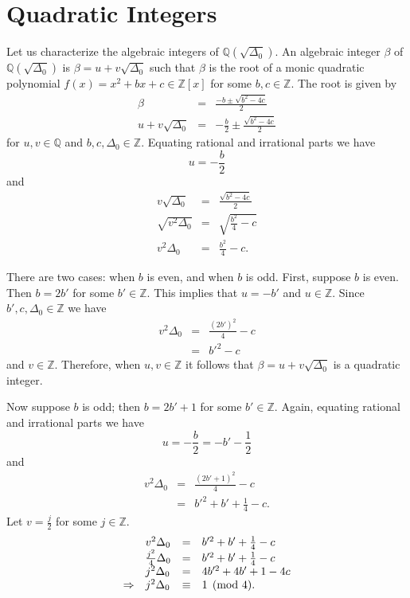 \documentclass{ucalgthes1}
\theoremstyle{plain}
\theoremstyle{definition}
\newcommand{\ZZ}{\mathbb{Z}}
\newcommand{\QQ}{\mathbb{Q}}
\begin{document}
\bigbreak
\section{Quadratic Integers}
Let us characterize the algebraic integers of $\QQ(\sqrt{\Delta_0})$.  An algebraic integer $\beta$ of $\QQ(\sqrt{\Delta_0})$ is $\beta = u+v \sqrt{\Delta_0}$ such that $\beta$ is the root of a monic quadratic polynomial $f(x) = x^2+bx+c \in \ZZ[x]$ for some $b,c \in \ZZ$.  The root is given by
\begin{eqnarray*}
	\beta & = & \frac{-b \pm \sqrt{b^2-4c}}{2} \\
	u + v \sqrt{\Delta_0} & = & -\frac{b}{2} \pm \frac{\sqrt{b^2-4c}}{2}
\end{eqnarray*}
for $u,v \in \QQ$ and $b,c,\Delta_0 \in \ZZ$.
Equating rational and irrational parts we have
\[
	u = -\frac{b}{2}
\]
and
\begin{eqnarray*}
	v \sqrt{\Delta_0} & = & \frac{\sqrt{b^2 -4c}}{2} \\
	\sqrt{v^2 \Delta_0} & = & \sqrt{\frac{b^2}{4} - c} \\
	v^2 \Delta_0 & = & \frac{b^2}{4} - c.
\end{eqnarray*}


There are two cases: when $b$ is even, and when $b$ is odd.  First, suppose $b$ is even.  Then $b=2b'$ for some $b' \in \ZZ$.  This implies that $u = -b'$ and $u \in \ZZ$.  Since $b', c, \Delta_0 \in \ZZ$ we have
\begin{eqnarray*}
	v^2 \Delta_0 & = & \frac{(2b')^2}{4} - c \\
	& = & b'^2 - c
\end{eqnarray*}
and $v \in \ZZ$.  Therefore, when $u, v \in \ZZ$ it follows that $\beta = u + v \sqrt{\Delta_0}$ is a quadratic integer.

\bigbreak
Now suppose $b$ is odd; then $b=2b' + 1$ for some $b' \in \ZZ$.  Again, equating rational and irrational parts we have
\[
	u = - \frac{b}{2} = -b' - \frac{1}{2}
\]
and
\begin{eqnarray*}
	v^2 \Delta_0 & = & \frac{(2b'+1)^2}{4} - c \\
	& = & b'^2 + b' + \frac{1}{4} -c.
\end{eqnarray*}
Let $v = \frac{j}{2}$ for some $j \in \ZZ$.  
\begin{equation*}
\begin{array}{l l l l}
	& v^2 \Delta_0 & = & b'^2 + b' + \frac{1}{4} -c \\
	& \frac{j^2}{4} \Delta_0 & = & b'^2 + b' + \frac{1}{4} -c \\
	& j^2 \Delta_0 & = & 4b'^2 + 4b' + 1 - 4c \\
	\Rightarrow & j^2 \Delta_0 & \equiv & 1 \pmod 4.
\end{array}
\end{equation*}
\end{document}
